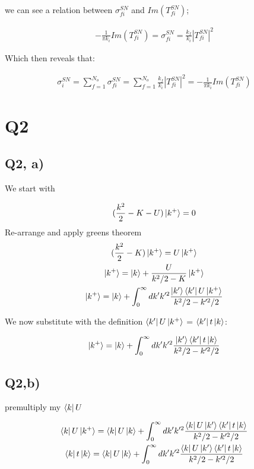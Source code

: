 \documentclass{article}
\begin{document}
		we can see a relation between $\sigma_{fi}^{SN}$ and $Im(T_{fi}^{SN})$;
		
		\begin{gather}
			-\frac{1}{\pi k_i}	Im(T_{fi}^{SN}) = \sigma_{fi}^{SN} = \frac{k_f}{k_i}|T_{fi}^{SN}|^2
		\end{gather}
		
		Which then reveals that:
		
		\begin{gather}
			\sigma_i^{SN} = \sum_{f=1}^{N_o} \sigma_{fi}^{SN} =  \sum_{f=1}^{N_o} \frac{k_f}{k_i}|T_{fi}^{SN}|^2 = -\frac{1}{\pi k_i}	Im(T_{fi}^{SN})
		\end{gather}
	
	
	
	\section{Q2}
		
		\subsection{Q2, a)}
			We start with
			
			\begin{gather}
				(\frac{k^2}{2} - K - U)\ket{k^+} = 0
			\end{gather}
			Re-arrange and apply greens theorem
			\begin{gather}
				(\frac{k^2}{2}-K)\ket{k^+} = U\ket{k^+}\\
				\ket{k^+} = \ket{k} + \frac{U}{k^2/2-K}\ket{k^+}\\
				\ket{k^+} = \ket{k} + \int_{0}^{\infty}dk'k'^2\frac{\ket{k'}\bra{k'}U\ket{k^+}}{k^2/2-k'^2/2}
			\end{gather}
			
			We now substitute with the definition $\bra{k'}U\ket{k^+}$ = $\bra{k'}t\ket{k}$:
			
			\begin{gather}
				\ket{k^+} = \ket{k} + \int_{0}^{\infty}dk'k'^2\frac{\ket{k'}\bra{k'}t\ket{k}}{k^2/2-k'^2/2}
			\end{gather}
		
		
		\subsection{Q2,b)}
		
			premultiply my $\bra{k}U$
			
			\begin{gather}
			\bra{k}U\ket{k^+} = \bra{k}U\ket{k} + \int_{0}^{\infty}dk'k'^2\frac{\bra{k}U\ket{k'}\bra{k'}t\ket{k}}{k^2/2-k'^2/2}\\
			\bra{k}t\ket{k} = \bra{k}U\ket{k} + \int_{0}^{\infty}dk'k'^2\frac{\bra{k}U\ket{k'}\bra{k'}t\ket{k}}{k^2/2-k'^2/2}\\
			\end{gather}
			
\end{document}
